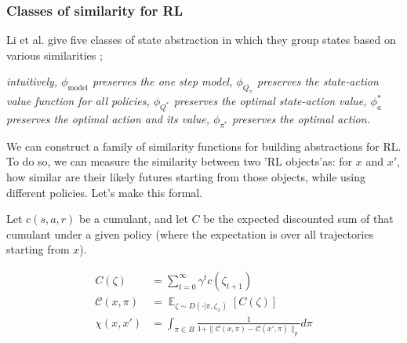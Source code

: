 \vspace{5mm}

\subsubsection{Classes of similarity for RL}\label{similar-classes}

Li et al. \cite{Littman2006} give five classes of state abstraction in which they group states based on various similarities \footnotemark[20];

\textit{intuitively,
$\phi_{\text{model}}$ preserves the one step model,
$\phi_{Q_{\pi}}$ preserves the state-action value function for all policies,
$\phi_{Q^{* }}$ preserves the optimal state-action value,
$\phi_a^{* }$ preserves the optimal action and its value,
$\phi_{\pi^{* }}$ preserves the optimal action.}

\vspace{5mm}

We can construct a family of similarity functions for building abstractions for RL. To do so, we can measure the
similarity between two 'RL objects'\footnotemark[28] as: for $x$ and $x'$,
how similar are their likely futures starting from those objects, while using different policies.
Let's make this formal.


Let $c(s, a, r)$ be a cumulant, and let $C$ be the expected discounted sum of that cumulant under a given policy
(where the expectation is over all trajectories starting from $x$).\footnotemark[29]


\begin{align*}
C(\zeta) &= \sum_{t=0}^{\infty} \gamma^{t}  c(\zeta_{t+1}) \\
\mathcal C(x, \pi) &= \mathop{\mathbb E}_{\zeta \sim D(\cdot | \pi, \zeta_{x})} [C(\zeta)] \\
\chi(x, x') &= \int_{\pi \in B} \frac{1}{1+\parallel \mathcal C(x, \pi) - \mathcal C(x', \pi) \parallel_{p}} d\pi
\end{align*}

